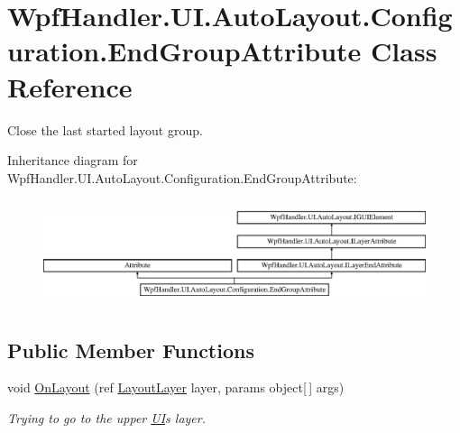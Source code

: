 \hypertarget{class_wpf_handler_1_1_u_i_1_1_auto_layout_1_1_configuration_1_1_end_group_attribute}{}\section{Wpf\+Handler.\+U\+I.\+Auto\+Layout.\+Configuration.\+End\+Group\+Attribute Class Reference}
\label{class_wpf_handler_1_1_u_i_1_1_auto_layout_1_1_configuration_1_1_end_group_attribute}


Close the last started layout group.  


Inheritance diagram for Wpf\+Handler.\+U\+I.\+Auto\+Layout.\+Configuration.\+End\+Group\+Attribute\+:\begin{figure}[H]
\begin{center}
\leavevmode
\includegraphics[height=3.128492cm]{db/de0/class_wpf_handler_1_1_u_i_1_1_auto_layout_1_1_configuration_1_1_end_group_attribute}
\end{center}
\end{figure}
\subsection*{Public Member Functions}
\begin{DoxyCompactItemize}
\item 
void \mbox{\hyperlink{class_wpf_handler_1_1_u_i_1_1_auto_layout_1_1_configuration_1_1_end_group_attribute_acaed685d0daf2b14d8f232389d56c478}{On\+Layout}} (ref \mbox{\hyperlink{class_wpf_handler_1_1_u_i_1_1_auto_layout_1_1_layout_layer}{Layout\+Layer}} layer, params object\mbox{[}$\,$\mbox{]} args)
\begin{DoxyCompactList}\small\item\em Trying to go to the upper \mbox{\hyperlink{namespace_wpf_handler_1_1_u_i}{UI}}\textquotesingle{}s layer. \end{DoxyCompactList}\end{DoxyCompactItemize}
